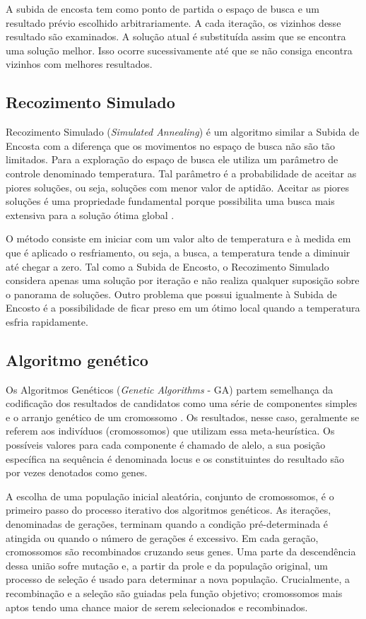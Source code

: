 A subida de encosta tem como ponto de partida o espaço de busca e um resultado prévio escolhido arbitrariamente. A cada iteração, os vizinhos desse resultado são examinados. A solução atual é substituída assim que se encontra uma solução melhor. Isso ocorre sucessivamente até que se não consiga encontra vizinhos com melhores resultados.  

\subsection{Recozimento Simulado}

Recozimento Simulado (\textit{Simulated Annealing}) é um algoritmo similar a Subida de Encosta com a diferença que os movimentos no espaço de busca não são tão limitados. Para a exploração do espaço de busca ele utiliza um parâmetro de controle denominado temperatura. Tal parâmetro é a probabilidade de aceitar as piores soluções, ou seja, soluções com menor valor de aptidão. Aceitar as piores soluções é uma propriedade fundamental porque possibilita uma busca mais extensiva para a solução ótima global \cite{kirkpatrick1983optimization}. 

O método consiste em iniciar com um valor alto de temperatura e à medida em que é aplicado o resfriamento, ou seja, a busca, a temperatura tende a diminuir até chegar a zero. Tal como a Subida de Encosto, o Recozimento Simulado considera apenas uma solução por iteração e não realiza qualquer suposição sobre o panorama de soluções. Outro problema que possui igualmente à Subida de Encosto é a possibilidade de ficar preso em um ótimo local quando a temperatura esfria rapidamente.

\subsection{Algoritmo genético}

Os Algoritmos Genéticos (\textit{Genetic Algorithms} - GA) partem semelhança da codificação dos resultados de candidatos como uma série de componentes simples e o arranjo genético de um cromossomo \cite{alander1998genetic}. Os resultados, nesse caso, geralmente se referem aos indivíduos (cromossomos) que utilizam essa meta-heurística. Os possíveis valores para cada componente é chamado de alelo, a sua posição específica na sequência é denominada locus e os constituintes do resultado são por vezes denotados como genes.

A escolha de uma população inicial aleatória, conjunto de cromossomos, é o primeiro passo do processo iterativo dos algoritmos genéticos. As iterações, denominadas de gerações, terminam quando a condição pré-determinada é atingida ou quando o número de gerações é excessivo. Em cada geração, cromossomos são recombinados cruzando seus genes. Uma parte da descendência dessa união sofre mutação e, a partir da prole e da população original, um processo de seleção é usado para determinar a nova população. Crucialmente, a recombinação e a seleção são guiadas pela função objetivo; cromossomos mais aptos tendo uma chance maior de serem selecionados e recombinados.

